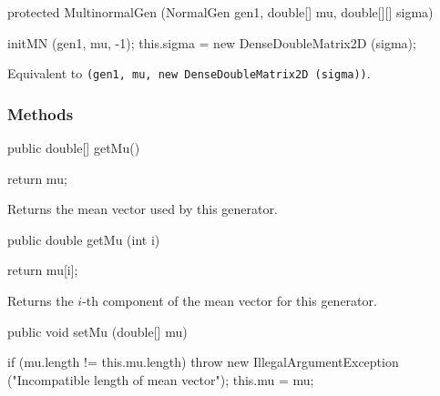 \begin{code}

   protected MultinormalGen (NormalGen gen1, double[] mu, double[][] sigma) \begin{hide} {
      initMN (gen1, mu, -1);
      this.sigma = new DenseDoubleMatrix2D (sigma);
   }\end{hide}
\end{code}
\begin{tabb}   Equivalent to
  \texttt{(gen1, mu, new DenseDoubleMatrix2D (sigma))}.
\end{tabb}



\subsubsection* {Methods}
\begin{code}
   public double[] getMu()\begin{hide} {
      return mu;
   }\end{hide}
\end{code}
\begin{tabb}   Returns the mean vector used by this generator.
\end{tabb}
\begin{htmlonly}
\end{htmlonly}
\begin{code}

   public double getMu (int i)\begin{hide} {
      return mu[i];
   }\end{hide}
\end{code}
\begin{tabb}   Returns the $i$-th component of the mean vector
 for this generator.
\end{tabb}
\begin{htmlonly}
\end{htmlonly}
\begin{code}

   public void setMu (double[] mu)\begin{hide} {
      if (mu.length != this.mu.length)
         throw new IllegalArgumentException
            ("Incompatible length of mean vector");
      this.mu = mu;
   }\end{hide}
\end{code}
